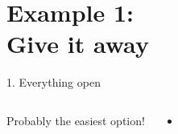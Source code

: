 \section[Everything open]{Example 1:\\ Give it away}
\label{sec:allopen}

\begin{frame}{1. Everything open}

\begin{columns}[c]
Probably the easiest option!
\begin{itemize}
    \item 
\end{itemize}

\end{columns}

\end{frame}

